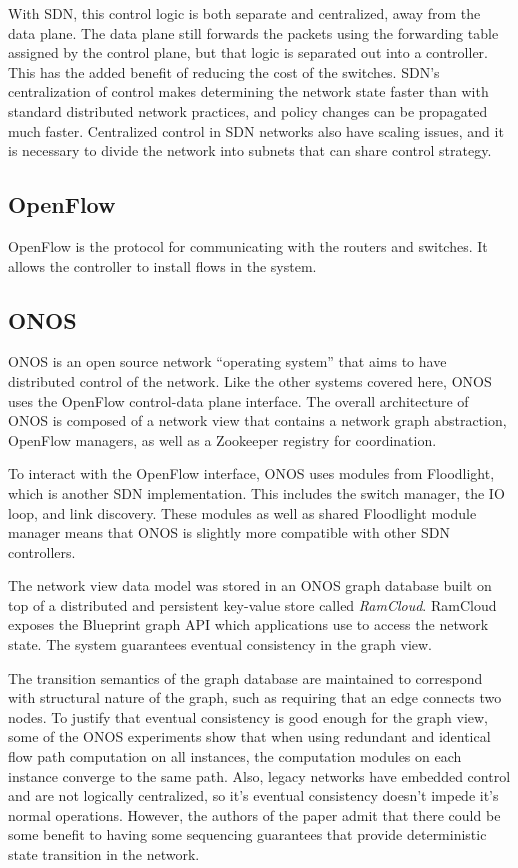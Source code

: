 \documentclass[letterpaper,twocolumn,10pt]{article}
\begin{document}
With SDN, this control logic is both separate and centralized, away from the data plane. The data plane still forwards the packets using the forwarding table assigned by the control plane, but that logic is separated out into a controller. This has the added benefit of reducing the cost of the switches. SDN's centralization of control makes determining the network state faster than with standard distributed network practices, and policy changes can be propagated much faster.
Centralized control in SDN networks also have scaling issues, and it is necessary to divide the network into subnets that can share control strategy.

\subsection*{OpenFlow}

OpenFlow is the protocol for communicating with the routers and switches. It allows the controller to install flows in the system.

\subsection{ONOS}

\cite{berde2014onos}
ONOS is an open source network ``operating system'' that aims to have distributed control of the network. Like the other systems covered here, ONOS uses the OpenFlow control-data plane interface. The overall architecture of ONOS is composed of a network view that contains a network graph abstraction, OpenFlow managers, as well as a Zookeeper registry for coordination.

To interact with the OpenFlow interface, ONOS uses modules from Floodlight, which is another SDN implementation. This includes the switch manager, the IO loop, and link discovery. These modules as well as shared Floodlight module manager means that ONOS is slightly more compatible with other SDN controllers.

The network view data model was stored in an ONOS graph database built on top of a distributed and persistent key-value store called \emph{RamCloud}. RamCloud exposes the Blueprint graph API which applications use to access the network state. The system guarantees eventual consistency in the graph view. 

The transition semantics of the graph database are maintained to correspond with structural nature of the graph, such as requiring that an edge connects two nodes. To justify that eventual consistency is good enough for the graph view, some of the ONOS experiments show that when using redundant and identical flow path computation on all instances, the computation modules on each instance converge to the same path. Also, legacy networks have embedded control and are not logically centralized, so it's eventual consistency doesn't impede it's normal operations. However, the authors of the paper admit that there could be some benefit to having some sequencing guarantees that provide deterministic state transition in the network.
\end{document}
